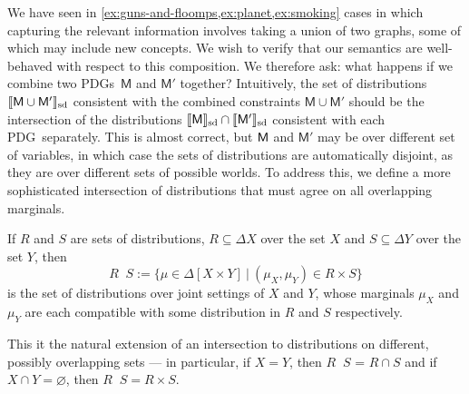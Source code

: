 \documentclass{article}
\newcommand{\notation}[2][]{#1}
\renewcommand{\notation}[2][]{{\color{notationcolor} #2}}
\newcommand\SD{_{\text{sd}}}
\DeclareMathOperator\dcap{\mathop{\dot\cap}}
\newcommand{\sfM}{\mathsf M}
\newcommand{\MN}{PDG}
\newcommand{\MNs}{\MN s}
\numberwithin{equation}{section}
\begin{document}
	We have seen
        in \cref{ex:guns-and-floomps,ex:planet,ex:smoking} cases in
        which capturing the relevant information involves taking a
        union of two graphs, some of which may include new
        concepts. We wish to verify that our semantics are
        well-behaved with respect to this composition.	  
	We therefore ask: what happens if we combine two \MNs\ $\sfM$
        and $\sfM'$ together? Intuitively, the set of distributions
        $\bbr{\sfM \cup \sfM'}\SD$ consistent with the combined
        constraints $\sfM\cup \sfM'$ should be the intersection of the
        distributions $\bbr{\sfM}\SD \cap \bbr{\sfM'}\SD$ consistent
        with each \MN\ separately. This is almost correct, but $\sf M$
        and $\sfM'$ may be over different set of variables, in which
        case the sets of distributions are automatically disjoint, as
        they are over different sets of possible worlds. To address
        this, we define a more sophisticated intersection of
        distributions that must agree on all overlapping
        marginals. %
	
	\begin{defn}[$\dcap$]\label{def:marginal-dist-intersection}
		If $R$ and $S$ are sets of distributions, $R \subseteq \Delta X$ over the set $X$ and $S\subseteq \Delta Y$ over the set $Y$, then
			{$$R \dcap S := \Big\{ \mu \in  \Delta [X \!\times\! Y] ~\Big|~ (\mu_{X}, \mu_{Y}) \in R \times S \Big\}  $$}%
		is the set of distributions over joint settings of $X$ and $Y$, whose marginals $\mu_X$ and $\mu_Y$ are each compatible with some distribution in $R$ and $S$ respectively. 
		
		This it the natural extension of an intersection to distributions on different, possibly overlapping sets --- in particular, if $X = Y$, then $R \dcap S$ = $R \cap S$ and if \notation[$X$ and $Y$ are disjoint]{$X \cap Y = \varnothing$}, then $R \dcap S = R \times S$. 
	\end{defn}
	
\end{document}
